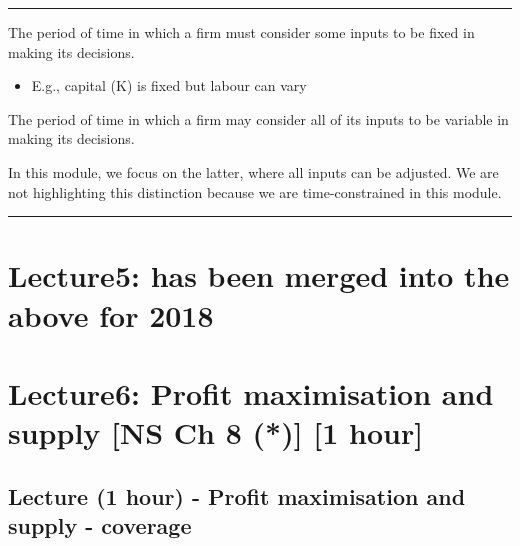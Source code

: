 \documentclass[]{article}
\providecommand{\tightlist}{%
  \setlength{\itemsep}{0pt}\setlength{\parskip}{0pt}}
\begin{document}
\begin{center}\rule{0.5\linewidth}{\linethickness}\end{center}

\begin{description}
\tightlist
\item[Short Run (SR)]
The period of time in which a firm must consider some inputs to be fixed in making its decisions.
\end{description}

\begin{itemize}
\tightlist
\item
  E.g., capital (K) is fixed but labour can vary
\end{itemize}

\bigskip

\begin{description}
\tightlist
\item[Long Run (LR)]
The period of time in which a firm may consider all of its inputs to be variable in making its decisions.
\end{description}

In this module, we focus on the latter, where all inputs can be adjusted. We are not highlighting this distinction because we are time-constrained in this module.\\

\begin{center}\rule{0.5\linewidth}{\linethickness}\end{center}

\hypertarget{lecture5-has-been-merged-into-the-above-for-2018}{%
\section{Lecture5: has been merged into the above for 2018}\label{lecture5-has-been-merged-into-the-above-for-2018}}

\hypertarget{lecture6-profit-maximisation-and-supply-ns-ch-8-1-hour}{%
\section{Lecture6: Profit maximisation and supply {[}NS Ch 8 (*){]} {[}1 hour{]}}\label{lecture6-profit-maximisation-and-supply-ns-ch-8-1-hour}}

\hypertarget{lecture-1-hour---profit-maximisation-and-supply---coverage}{%
\subsection{Lecture (1 hour) - Profit maximisation and supply - coverage}\label{lecture-1-hour---profit-maximisation-and-supply---coverage}}
\end{document}
